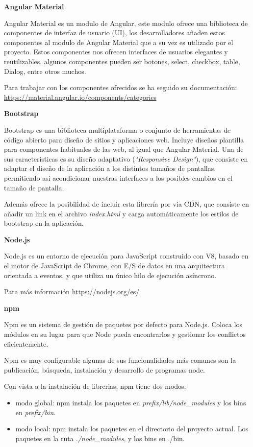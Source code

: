 \textbf{Angular Material}

Angular Material es un modulo de Angular, este modulo ofrece una biblioteca de componentes de interfaz de usuario (UI), los desarrolladores añaden estos componentes al modulo de Angular Material que a su vez es utilizado por el proyecto. Estos componentes nos  ofrecen interfaces de usuarios elegantes  y reutilizables, algunos componentes pueden ser botones, select, checkbox, table, Dialog, entre otros muchos.

Para trabajar con los componentes ofrecidos se ha seguido su documentación: \url{https://material.angular.io/components/categories}

\textbf{Bootstrap}

Bootstrap es una biblioteca multiplataforma o conjunto de herramientas de código abierto  para diseño de sitios y aplicaciones web. Incluye diseños plantilla para componentes habituales de las web, al igual que Angular Material. Una de sus características es su diseño adaptativo (\textit{"Responsive Design"}), que consiste en adaptar el diseño  de la aplicación a los distintos tamaños  de pantallas, permitiendo así acondicionar nuestras interfaces a los posibles cambios en el tamaño de pantalla.

Además ofrece la posibilidad de incluir esta librería por via CDN, que consiste en añadir un link en el archivo \textit{index.html} y carga automáticamente los estilos de bootstrap en la aplicación.


\textbf{Node.js}

Node.js es un entorno de ejecución para JavaScript construido con V8, basado en el motor de JavaScript de Chrome, con E/S de datos en una arquitectura orientada a eventos, y que utiliza un único hilo de ejecución asíncrono.

Para más información \url{https://nodejs.org/es/}

\textbf{npm}

Npm es un sistema de gestión de paquetes por defecto para Node.js. Coloca los módulos en su lugar para que Node pueda encontrarlos y gestionar los conflictos eficientemente.

Npm es muy configurable algunas de sus funcionalidades más comunes son la publicación, búsqueda, instalación y desarrollo de programas  node.

Con vista a la instalación de librerias, npm tiene dos modos: 
\begin{itemize}
	\item modo  global: npm instala los paquetes en \textit{prefix/lib/node\_modules} y los bins en \textit{prefix/bin}.
	\item modo local: npm instala los paquetes en el directorio del proyecto actual. Los paquetes en la ruta \textit{./node\_modules}, y los bins en ./bin.
\end{itemize}

